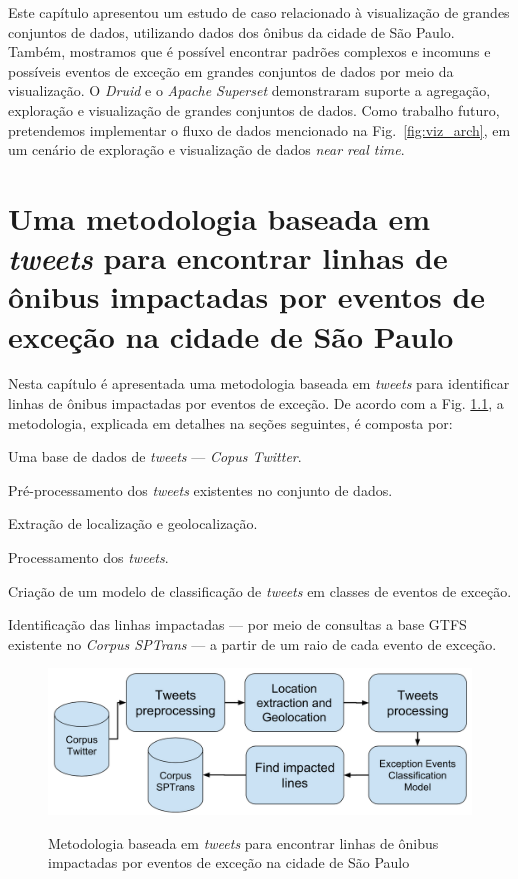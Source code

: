 \documentclass[
	12pt,				%
	oneside,			%
	a4paper,			%
	english,			%
	brazil				%
	]{abntex2ppgsi}
\begin{document}
{{Este capítulo apresentou um estudo de caso relacionado à visualização de grandes conjuntos de dados, utilizando dados dos ônibus da cidade de São Paulo. Também, mostramos que é possível encontrar padrões complexos e incomuns e possíveis eventos de exceção em grandes conjuntos de dados por meio da visualização. O \textit{Druid} e o \textit{Apache Superset} demonstraram suporte a agregação, exploração e visualização de grandes conjuntos de dados. Como trabalho futuro, pretendemos implementar o fluxo de dados mencionado na Fig.~\ref{fig:viz_arch}, em um cenário de exploração e visualização de dados \textit{near real time}.


\chapter{Uma metodologia baseada em \textit{tweets} para encontrar linhas de ônibus impactadas por eventos de exceção na cidade de São Paulo}
\label{exp1}

Nesta capítulo é apresentada uma metodologia baseada em \textit{tweets} para identificar linhas de ônibus impactadas por eventos de exceção. De acordo com a Fig. \ref{fig:tweet_based_methodology}, a metodologia, explicada em detalhes na seções seguintes, é composta por:
\begin{enumerate*}
\item Uma base de dados de \textit{tweets} --- \textit{Copus Twitter}.
\item Pré-processamento dos \textit{tweets} existentes no conjunto de dados.
\item Extração de localização e geolocalização.
\item Processamento dos \textit{tweets}.
\item Criação de um modelo de classificação de \textit{tweets} em classes de eventos de exceção.
\item Identificação das linhas impactadas --- por meio de consultas a base GTFS existente no \textit{Corpus SPTrans} --- a partir de um raio de cada evento de exceção.
\end{enumerate*}

\begin{figure}[!htb]
	\centering
 	  \caption{Metodologia baseada em \textit{tweets} para encontrar linhas de ônibus impactadas por eventos de exceção na cidade de São Paulo}
		\includegraphics[width=0.7\linewidth]{images/tweet_based_methodology.png}
	\label{fig:tweet_based_methodology}
\end{figure}

}}
\end{document}
